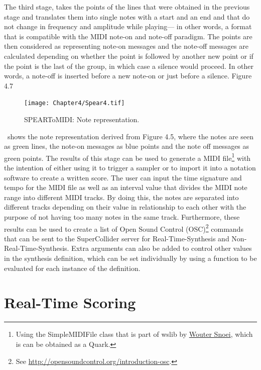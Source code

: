 The third stage, takes the points of the lines that were obtained in the previous stage and translates them into single notes with a start and an end and that do not change in frequency and amplitude while playing--- in other words, a format that is compatible with the MIDI note-on and note-off paradigm. The points are then considered as representing note-on messages and the note-off messages are calculated depending on whether the point is followed by another new point or if the point is the last of the group, in which case a silence would proceed. In other words, a note-off is inserted before a new note-on or just before a silence. Figure 4.7 
\begin{figure}[htbp] %
   \centering
   \texttt{[image: Chapter4/Spear4.tif]} %
   \caption{SPEARToMIDI: Note representation.}
   \label{fig:example}
\end{figure}\
shows the note representation derived from Figure 4.5, where the notes are seen as green lines, the note-on messages as blue points and the note off messages as green points. 
The results of this stage can be used to generate a MIDI file\hypertarget{wlib}{}\footnote{Using the SimpleMIDIFile class that is part of wslib by \href{http://www.woutersnoei.nl/}{Wouter Snoei}, which is can be obtained as a Quark.} with the intention of either using it to trigger a sampler or to import it into a notation software to create a written score. The user can input the time signature and tempo for the MIDI file as well as an interval value that divides the MIDI note range into different MIDI tracks. By doing this, the notes are separated into different tracks depending on their value in relationship to each other with the purpose of not having too many notes in the same track. Furthermore, these results can be used to create a list of Open Sound Control (OSC)\footnote{See \href{http://opensoundcontrol.org/introduction-osc}{http://opensoundcontrol.org/introduction-osc}.} commands that can be sent to the SuperCollider server for Real-Time-Synthesis and Non-Real-Time-Synthesis. Extra arguments can also be added to control other values in the synthesis definition, which can be set individually by using a function to be evaluated for each instance of the definition.

\section{Real-Time Scoring}

